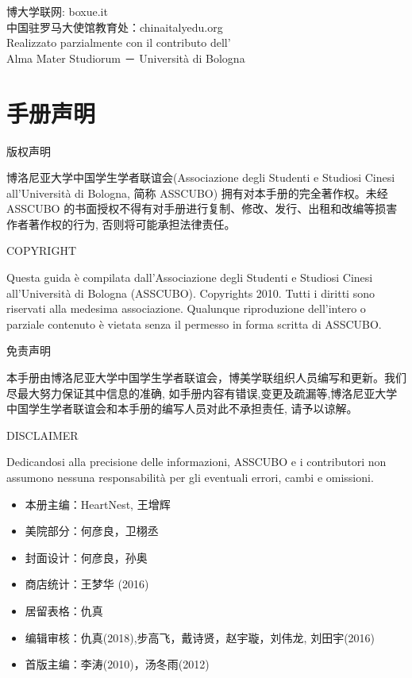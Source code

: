 \documentclass[3pt,a5paper,openright,twoside]{book}
\begin{document}
\begin{titlepage}
\vspace*{0.8cm}
\begin{center}
博大学联网: boxue.it\\
中国驻罗马大使馆教育处：chinaitalyedu.org\\
Realizzato parzialmente con il contributo dell'\\
Alma Mater Studiorum － Universit\`a di Bologna
\end{center}

\newpage


\topmargin=-2cm                        %

\chapter*{手册声明}                 %
\pagestyle{empty}%
\thispagestyle{empty} 

\vspace{0.3cm}\centerline{\Large 版权声明}
博洛尼亚大学中国学生学者联谊会(Associazione degli Studenti e Studiosi 
Cinesi all’Università di Bologna, 简称 ASSCUBO) 拥有对本手册的完全著作权。未经 ASSCUBO 的书面授权不得有对手册进行复制、修改、发行、出租和改编等损害作者著作权的行为, 否则将可能承担法律责任。 

\vspace{0.3cm}\centerline{\Large COPYRIGHT}
Questa guida è compilata dall’Associazione degli Studenti e Studiosi Cinesi all’Università di Bologna (ASSCUBO). Copyrights 2010. Tutti i diritti sono riservati alla medesima associazione. Qualunque riproduzione dell’intero o parziale contenuto è vietata senza il permesso in forma scritta di ASSCUBO. 

\vspace{0.3cm}\centerline{\Large 免责声明}
本手册由博洛尼亚大学中国学生学者联谊会，博美学联组织人员编写和更新。我们尽最大努力保证其中信息的准确, 如手册内容有错误,变更及疏漏等,博洛尼亚大学中国学生学者联谊会和本手册的编写人员对此不承担责任, 请予以谅解。 

\vspace{0.3cm}\centerline{\Large DISCLAIMER}
Dedicandosi alla precisione delle informazioni, ASSCUBO e i contributori non assumono nessuna responsabilità per gli eventuali errori, cambi e omissioni. 

\vspace{0.8cm}
\begin{itemize}
\item[] 本册主编：HeartNest, 王增辉
\item[] 美院部分：何彦良，卫栩丞
\item[] 封面设计：何彦良，孙奥
\item[] 商店统计：王梦华 (2016)
\item[] 居留表格：仇真
\item[] 编辑审核：仇真(2018),步高飞，戴诗贤，赵宇璇，刘伟龙, 刘田宇(2016)
\item[] 首版主编：李涛(2010)，汤冬雨(2012)
\end{itemize}


\clearpage{\pagestyle{empty}\cleardoublepage}%
\end{titlepage}
\end{document}
